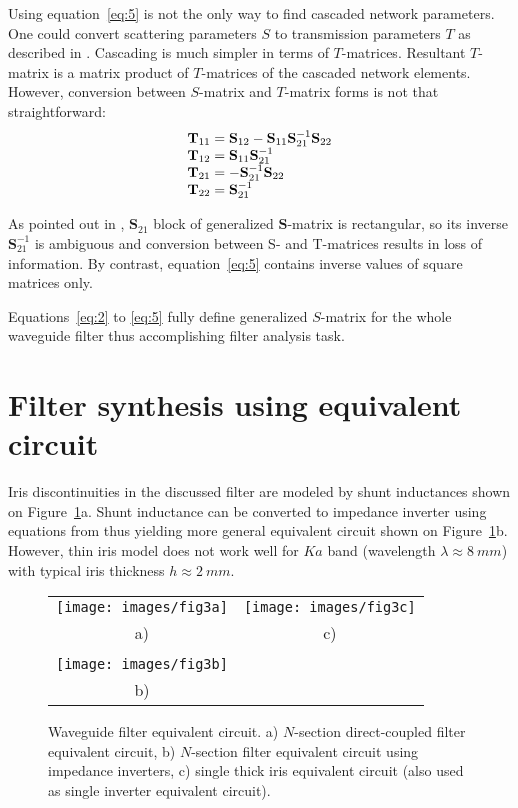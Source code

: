\documentclass{pj}
\begin{document}
Using equation~\eqref{eq:5} is not the only way to find
cascaded network parameters. One could convert scattering parameters
$S$ to transmission parameters $T$ as described in
\cite{frei2008}. Cascading is much simpler in terms of
$T$-matrices. Resultant $T$-matrix is a matrix product of
$T$-matrices of the cascaded network elements. However, conversion
between $S$-matrix and $T$-matrix forms is not that straightforward:
\begin{equation}
  \label{eq:6}
  \begin{array}{r@{}l}
    \mathbf{T}_{11} &{}= \mathbf{S}_{12} - \mathbf{S}_{11}\mathbf{S}_{21}^{-1}\mathbf{S}_{22} \\
    \mathbf{T}_{12} &{}= \mathbf{S}_{11}\mathbf{S}_{21}^{-1} \\
    \mathbf{T}_{21} &{}= -\mathbf{S}_{21}^{-1}\mathbf{S}_{22} \\
    \mathbf{T}_{22} &{}= \mathbf{S}_{21}^{-1}
  \end{array}
\end{equation}

As pointed out in \cite{frei2008}, $\mathbf{S}_{21}$ block of
generalized $\mathbf{S}$-matrix is rectangular, so its inverse
$\mathbf{S}_{21}^{-1}$ is ambiguous and conversion between S- and
T-matrices results in loss of information. By contrast,
equation~\eqref{eq:5} contains inverse values of square
matrices only.

Equations~\eqref{eq:2} to \eqref{eq:5} fully define
generalized $S$-matrix for the whole waveguide filter thus
accomplishing filter analysis task.

\section{Filter synthesis using equivalent circuit}
\label{sec:filter-synth}

Iris discontinuities in the discussed filter are modeled by shunt
inductances shown on Figure~\ref{fig:3}a. Shunt inductance can
be converted to impedance inverter using equations from
\cite{pozar2012microwave} thus yielding more general equivalent
circuit shown on Figure~\ref{fig:3}b. However, thin iris model
does not work well for $Ka$ band (wavelength $\lambda \approx 8~mm$)
with typical iris thickness $h \approx 2~mm$.

\begin{figure}[h]
  \begin{tabular}{cc}
    \texttt{[image: images/fig3a]} & \texttt{[image: images/fig3c]}
    \\
    a) & c) \\
    & \\
    \texttt{[image: images/fig3b]} & \\
    b) & \\
  \end{tabular}
  
  \caption{Waveguide filter equivalent circuit.  a) $N$-section
    direct-coupled filter equivalent circuit, b) $N$-section filter
    equivalent circuit using impedance inverters, c) single thick
    iris equivalent circuit (also used as single inverter equivalent circuit).}
  \label{fig:3}
\end{figure}
\end{document}
